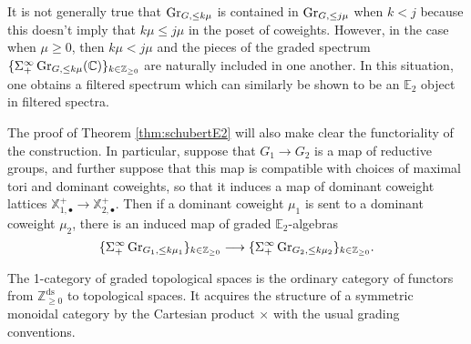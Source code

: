 \begin{rmk}
It is not generally true that $\operatorname{\mathrm{Gr}}_{G,\leq k\mu}$ is contained in $\operatorname{\mathrm{Gr}}_{G, \leq j\mu}$ when $k<j$ because this doesn't imply that $k\mu \leq j\mu$ in the poset of coweights.  However, in the case when $\mu \geq 0$, then $k\mu < j\mu$ and the pieces of the graded spectrum $ \{ \Sigma^{\infty}_+ \operatorname{\mathrm{Gr}}_{G,\leq k\mu}(\mathbb{C})\}_{k\in \mathbb{Z}_{\geq 0}}$ are naturally included in one another.  In this situation, one obtains a filtered spectrum which can similarly be shown to be an $\mathbb{E}_2$ object in filtered spectra.  
\end{rmk}


\begin{rmk} The proof of Theorem \ref{thm:schubertE2} will also make clear the functoriality of the construction.  In particular, suppose that $G_1 \longrightarrow G_2$ is a map of reductive groups, and further suppose that this map is compatible with choices of maximal tori and dominant coweights, so that it induces a map of dominant coweight lattices $\mathbb{X}_{1,\bullet}^+ \longrightarrow \mathbb{X}_{2,\bullet}^+$.  Then if a dominant coweight $\mu_1$ is sent to a dominant coweight $\mu_2$, there is an induced map of graded $\mathbb{E}_2$-algebras
$$\{\Sigma^{\infty}_+ \operatorname{\mathrm{Gr}}_{G_1, \leq k \mu_1} \}_{k\in \mathbb{Z}_{\geq 0}} \longrightarrow \{\Sigma^{\infty}_+ \operatorname{\mathrm{Gr}}_{G_2, \leq k \mu_2} \}_{k\in \mathbb{Z}_{\geq 0}}.$$
\end{rmk}

\begin{dfn}
The 1-category of graded topological spaces is the ordinary category of functors from $\mathbb{Z}_{\geq 0}^{\mathrm{ds}}$ to topological spaces.  It acquires the structure of a symmetric monoidal category by the Cartesian product $\times$ with the usual grading conventions.  
\end{dfn}

